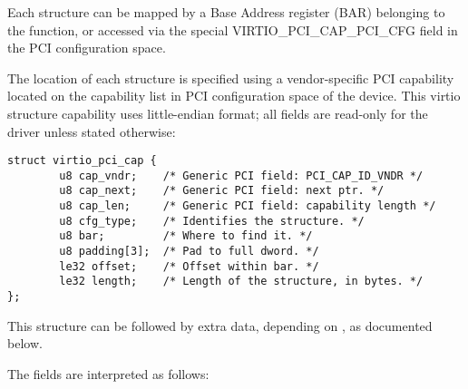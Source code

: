 Each structure can be mapped by a Base Address register (BAR) belonging to
the function, or accessed via the special VIRTIO_PCI_CAP_PCI_CFG field in the PCI configuration space.

The location of each structure is specified using a vendor-specific PCI capability located
on the capability list in PCI configuration space of the device.
This virtio structure capability uses little-endian format; all fields are
read-only for the driver unless stated otherwise:

\begin{lstlisting}
struct virtio_pci_cap {
        u8 cap_vndr;    /* Generic PCI field: PCI_CAP_ID_VNDR */
        u8 cap_next;    /* Generic PCI field: next ptr. */
        u8 cap_len;     /* Generic PCI field: capability length */
        u8 cfg_type;    /* Identifies the structure. */
        u8 bar;         /* Where to find it. */
        u8 padding[3];  /* Pad to full dword. */
        le32 offset;    /* Offset within bar. */
        le32 length;    /* Length of the structure, in bytes. */
};
\end{lstlisting}

This structure can be followed by extra data, depending on
, as documented below.

The fields are interpreted as follows:

